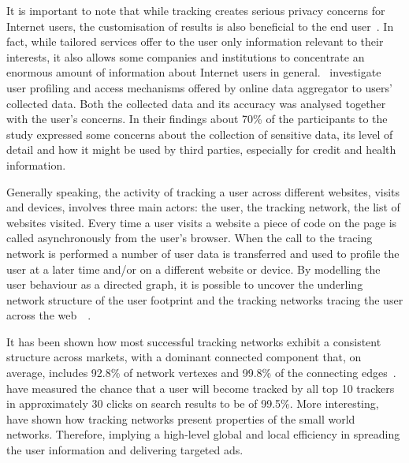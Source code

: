 It is important to note that while tracking creates serious privacy concerns for Internet users, the customisation of results is also beneficial to the end user~\cite{castelluccia2012behavioural}. In fact, while tailored services offer to the user only information relevant to their interests, it also allows some companies and institutions to concentrate an enormous amount of information about Internet users in general.~\cite{rao2015they} investigate user profiling and access mechanisms offered by online data aggregator to users' collected data. Both the collected data and its accuracy was analysed together with the user's concerns. In their findings about 70\% of the participants to the study expressed some concerns about the collection of sensitive data, its level of detail and how it might be used by third parties, especially for credit and health information.

Generally speaking, the activity of tracking a user across different websites, visits and devices, involves three main actors: the user, the tracking network, the list of websites visited. Every time a user visits a website a piece of code on the page is called asynchronously from the user's browser. When the call to the tracing network is performed a number of user data is transferred and used to profile the user at a later time and/or on a different website or device.  By modelling the user behaviour as a directed graph, it is possible to uncover the underling network structure of the user footprint and the tracking networks tracing the user across the web~\cite{kalavri2016like}~\cite{schelter2016tracking}.

It has been shown how most successful tracking networks exhibit a consistent structure across markets, with a dominant connected component that, on average, includes 92.8\% of network vertexes and 99.8\% of the connecting edges~\cite{gomer2013network}.~\cite{gomer2013network} have measured the chance that a user will become tracked by all top 10 trackers in approximately 30 clicks on search results to be of 99.5\%. More interesting,~\cite{gomer2013network} have shown how tracking networks present properties of the small world networks. Therefore, implying a high-level global and local efficiency in spreading the user information and delivering targeted ads.

